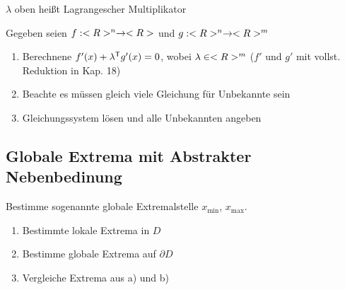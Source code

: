 \begin{*definition}
	$\lambda$ oben heißt Lagrangescher Multiplikator
\end{*definition}

\begin{boldenvironment}\vspace*{0pt}
	Gegeben seien $f: <R>^n \to <R>$ und $g: <R>^n \to <R>^m$
	\begin{enumerate}[label={\alph*)},topsep=\dimexpr-\baselineskip/2\relax]
		\item Berechnene $f'(x) + \lambda^\mathsf{T} g'(x) = 0$, wobei $\lambda \in <R>^m$ ($f'$ und $g'$ mit vollst. Reduktion in Kap. 18)
		\item Beachte es müssen gleich viele Gleichung für Unbekannte sein
		\item Gleichungssystem lösen und alle Unbekannten angeben
	\end{enumerate}
\end{boldenvironment}

\subsection{Globale Extrema mit Abstrakter Nebenbedinung}
\begin{boldenvironment}[Frage]
	Bestimme sogenannte globale Extremalstelle $x_{\min}$, $x_{\max}$.
\end{boldenvironment}

\begin{boldenvironment}[Strategie]\vspace*{0pt}
	\begin{enumerate}[label={\alph*)},topsep=\dimexpr-\baselineskip/2\relax]
		\item Bestimmte lokale Extrema in $D$
		\item Bestimme globale Extrema auf $\partial D$
		\item Vergleiche Extrema aus a) und b)
	\end{enumerate}
\end{boldenvironment}